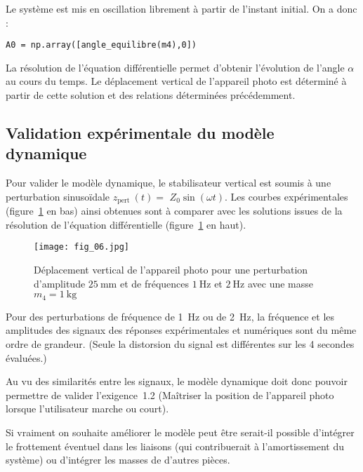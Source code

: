 \ifprof
\begin{corrige}
Le système est mis en oscillation librement à partir de l'instant initial. On a donc :
\begin{lstlisting}
A0 = np.array([angle_equilibre(m4),0])
\end{lstlisting}

\end{corrige}
\else
\fi

\ifprof
\else
La résolution de l'équation différentielle permet d'obtenir l'évolution de l'angle $\alpha$ au cours du temps. Le déplacement vertical de l'appareil photo est déterminé à partir de cette solution et des relations déterminées précédemment.
\fi

\subsection{Validation expérimentale du modèle dynamique}
\ifprof
\else
Pour valider le modèle dynamique, le stabilisateur vertical est soumis à une perturbation sinusoïdale $z_{\text {pert }}(t)=$ $Z_{0} \sin (\omega t)$. Les courbes expérimentales (figure~\ref{fig:06} en bas) ainsi obtenues sont à comparer avec les solutions issues de la résolution de l'équation différentielle (figure~\ref{fig:06} en haut).

\begin{figure}[H]
\centering
\texttt{[image: fig\_06.jpg]}
\caption{\label{fig:06} Déplacement vertical de l'appareil photo pour une perturbation d'amplitude $25 \mathrm{~mm}$ et de fréquences $1 \mathrm{~Hz}$ et $2 \mathrm{~Hz}$ avec une masse $m_{4}=1 \mathrm{~kg}$}
\end{figure}
\fi

\ifprof
\begin{corrige}
Pour des perturbations de fréquence de \SI{1}{Hz} ou de \SI{2}{Hz}, la fréquence et les amplitudes des signaux des réponses expérimentales et numériques sont du même ordre de grandeur. (Seule la distorsion du signal est différentes sur les 4 secondes évaluées.)

Au vu des similarités entre les signaux, le modèle dynamique doit donc pouvoir permettre de valider l'exigence~1.2 (Maîtriser la position de l’appareil photo lorsque l’utilisateur marche ou court).

Si vraiment on souhaite améliorer le modèle peut être serait-il possible d'intégrer le frottement éventuel dans les liaisons (qui contribuerait à l'amortissement du système) ou d'intégrer les masses de d'autres pièces.
\end{corrige}
\else
\fi

